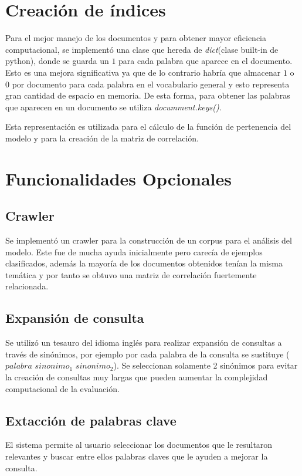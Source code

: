 \documentclass[]{article}
\begin{document}
\section{Creación de índices}
\label{section:indexes}
Para el mejor manejo de los documentos y para obtener mayor eficiencia computacional, se implementó una clase que hereda de \textit{dict}(clase built-in de python), donde se guarda un $1$ para cada palabra que aparece en el documento. Esto es una mejora significativa ya que de lo contrario habría que almacenar $1$ o $0$ por documento para cada palabra en el vocabulario general y esto representa gran cantidad de espacio en memoria. De esta forma, para obtener las palabras que aparecen en un documento se utiliza \textit{documment.keys()}.

Esta representación es utilizada para el cálculo de la función de pertenencia del modelo y para la creación de la matriz de correlación.


\section{Funcionalidades Opcionales}
\label{section:extraf}
\subsection{Crawler}

Se implementó un crawler para la construcción de un corpus para el análisis del modelo. Este fue de mucha ayuda inicialmente pero carecía de ejemplos clasificados, además la mayoría de los documentos obtenidos tenían la misma temática y por tanto se obtuvo una matriz de correlación fuertemente relacionada.

\subsection{Expansión de consulta}
 Se utilizó un tesauro del idioma inglés para realizar expansión de consultas a través de sinónimos, por ejemplo por cada palabra de la consulta se sustituye ($palabra$ \textbar $sinonimo_1$ \textbar $sinonimo_2$). Se seleccionan solamente 2 sinónimos para evitar la creación de consultas muy largas que pueden aumentar la complejidad computacional de la evaluación.
 
 \subsection{Extacción de palabras clave}
 El sistema permite al usuario seleccionar los documentos que le resultaron relevantes y buscar entre ellos palabras claves que le ayuden a mejorar la consulta.
 
\end{document}

